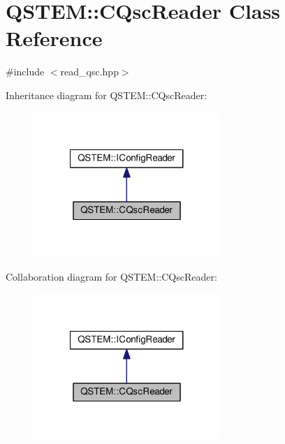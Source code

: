 \hypertarget{class_q_s_t_e_m_1_1_c_qsc_reader}{\section{Q\-S\-T\-E\-M\-:\-:C\-Qsc\-Reader Class Reference}
\label{class_q_s_t_e_m_1_1_c_qsc_reader}
}


{\ttfamily \#include $<$read\-\_\-qsc.\-hpp$>$}



Inheritance diagram for Q\-S\-T\-E\-M\-:\-:C\-Qsc\-Reader\-:
\nopagebreak
\begin{figure}[H]
\begin{center}
\leavevmode
\includegraphics[width=200pt]{class_q_s_t_e_m_1_1_c_qsc_reader__inherit__graph}
\end{center}
\end{figure}


Collaboration diagram for Q\-S\-T\-E\-M\-:\-:C\-Qsc\-Reader\-:
\nopagebreak
\begin{figure}[H]
\begin{center}
\leavevmode
\includegraphics[width=200pt]{class_q_s_t_e_m_1_1_c_qsc_reader__coll__graph}
\end{center}
\end{figure}
